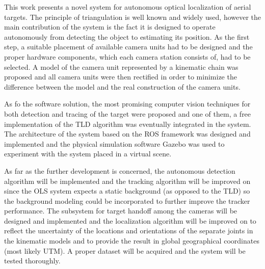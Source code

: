 

This work presents a novel system for autonomous optical localization of aerial targets. The principle of triangulation is well known and widely used, however the main contribution of the system is the fact it is designed to operate autonomously from detecting the object to estimating its position. As the first step, a suitable placement of available camera units had to be designed and the proper hardware components, which each camera station consists of, had to be selected. A model of the camera unit represented by a kinematic chain was proposed and all camera units were then rectified in order to minimize the difference between the model and the real construction of the camera units.

As fo the software solution, the most promising computer vision techniques for both detection and tracing of the target were proposed and one of them, a free implementation of the TLD algorithm was eventually integrated in the system. The architecture of the system based on the ROS framework was designed and implemented and the physical simulation software Gazebo was used to experiment with the system placed in a virtual scene.

As far as the further development is concerned, the autonomous detection algorithm will be implemented and the tracking algorithm will be improved on since the OLS system expects a static background (as opposed to the TLD) so the background modeling could be incorporated to further improve the tracker performance. The subsystem for target handoff among the cameras will be designed and implemented and the localization algorithm will be improved on to reflect the uncertainty of the locations and orientations of the separate joints in the kinematic models and to provide the result in global geographical coordinates (most likely UTM). A proper dataset will be acquired and the system will be tested thoroughly.

\vata[5]